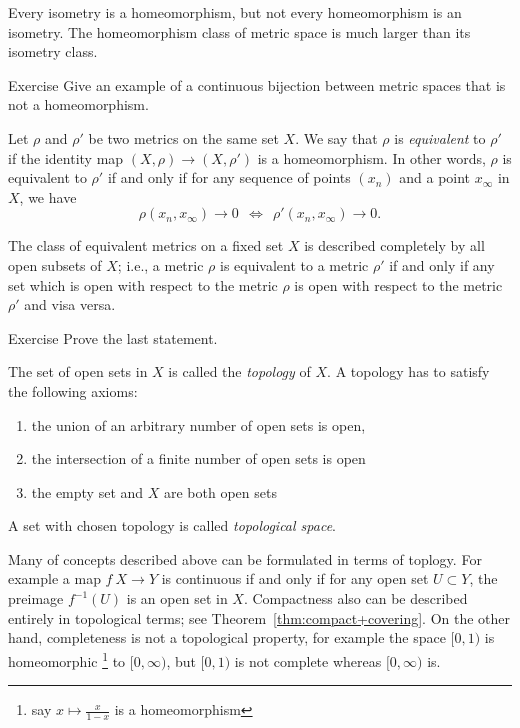 Every isometry is a homeomorphism,
but not every homeomorphism is an isometry.
The homeomorphism class of metric space is much larger than its isometry class.

\begin{thm}{Exercise}\label{ex:cont+biject}
Give an example of a continuous bijection between metric spaces that is not a homeomorphism.
\end{thm}

Let $\rho$ and $\rho'$ be two metrics on the same set $X$.
We say that $\rho$ is \emph{equivalent} to $\rho'$ if the identity map 
$(X,\rho)\to (X,\rho')$ is a homeomorphism.
In other words, $\rho$ is equivalent to $\rho'$ if and only if
for any sequence of points $(x_n)$ and a point $x_\infty$ in $X$, we have
$$\rho(x_n,x_\infty)\to 0\ \ \Leftrightarrow\ \ \rho'(x_n,x_\infty)\to 0.$$

The class of equivalent metrics on a fixed set $X$
is described completely by all open subsets of $X$;
i.e., a metric $\rho$ is equivalent to a metric $\rho'$
if and only if any set which is open with respect to the metric $\rho$ is open with respect to the
metric $\rho'$ and visa versa.
\begin{thm}{Exercise}
Prove the last statement. 
\end{thm}

The set of open sets in $X$ is called the \emph{topology} of $X$.
A topology has to satisfy the following axioms:
\begin{enumerate}
\item the union of an arbitrary number of open sets is open,
\item the intersection of a finite number of open sets is open
\item the empty set and $X$ are both open sets
\end{enumerate}
A set with chosen topology is called \emph{topological space}.

Many of concepts described above can be formulated in terms of toplogy.
For example a map $f\: X\to Y$ is continuous if and only if for any open set $U\subset Y$,
the preimage $f^{-1}(U)$ is an open set in $X$.
Compactness also can be described entirely in topological terms;
see Theorem~\ref{thm:compact+covering}.
On the other hand, completeness is not a topological property,
for example the space $[0,1)$ is homeomorphic%
\footnote{say $x\mapsto \tfrac x{1-x}$ is a homeomorphism}
to $[0,\infty)$, but $[0,1)$ is not complete whereas $[0,\infty)$ is.

